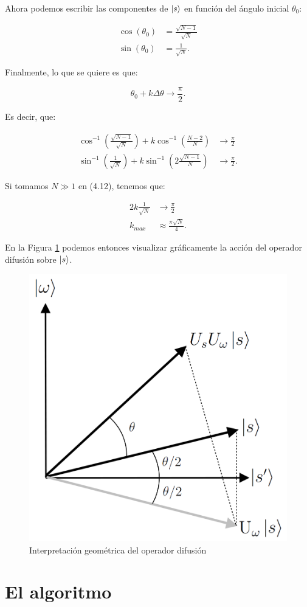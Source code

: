 Ahora podemos escribir las componentes de $\ket{s}$ en función del ángulo inicial $\theta_0$:

\begin{align}
    \cos(\theta_0) &= \frac{\sqrt{N-1}}{\sqrt{N}} \\
    \sin(\theta_0) &= \frac{1}{\sqrt{N}} .
    \label{eq:sinTheta0}
\end{align}

Finalmente, lo que se quiere es que:

\begin{equation}
    \theta_0 + k \Delta\theta \to \frac{\pi}{2} .
\end{equation}

Es decir, que:

\begin{align}
    \cos^{-1}(\frac{\sqrt{N-1}}{\sqrt{N}}) + k\cos^{-1}(\frac{N-2}{N}) &\to \frac{\pi}{2} \\
    \sin^{-1}(\frac{1}{\sqrt{N}}) + k\sin^{-1}(2\frac{\sqrt{N-1}}{N}) &\to \frac{\pi}{2} .
\end{align}

Si tomamos $N \gg 1$ en (4.12), tenemos que:

\begin{align}
    2k \frac{1}{\sqrt{N}} &\to \frac{\pi}{2} \\
    k_{max} &\approx \frac{\pi \sqrt{N}}{4} .
\end{align}

En la Figura \ref{fig:groverdifusion} podemos entonces visualizar gráficamente la acción del operador difusión sobre $\ket{s}$.

\begin{figure}[H]
\centering \includegraphics[width=0.3\linewidth]{img/grover_geometry.png}
\caption{Interpretación geométrica del operador difusión}
\label{fig:groverdifusion}
\end{figure}

\section{El algoritmo}

